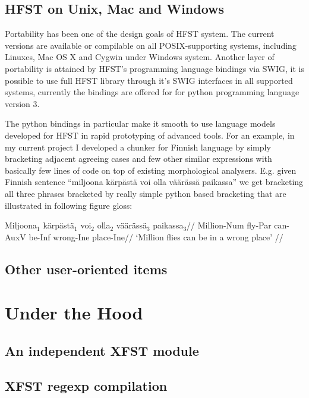 \documentclass{llncs}
\begin{document}
\subsection{HFST on Unix, Mac and Windows}

Portability has been one of the design goals of HFST system. The current 
versions are available or compilable on all POSIX-supporting systems, including
Linuxes, Mac OS X and Cygwin under Windows system. Another layer of portability
is attained by HFST's programming language bindings via SWIG, it is possible to
use full HFST library through it's SWIG interfaces in all supported systems,
currently the bindings are offered for for python programming language version
3.

The python bindings in particular make it smooth to use language models
developed for HFST in rapid prototyping of advanced tools. For an example, in
my current project I developed a chunker for Finnish language by simply
bracketing adjacent agreeing cases and few other similar expressions with
basically few lines of code on top of existing morphological analysers. E.g.
given Finnish sentence ``miljoona kärpästä voi olla väärässä paikassa'' we get
bracketing all three phrases bracketed by really simple python based bracketing
that are illustrated in following figure gloss:

\ex
\begingl
\gla Miljoona$_1$ kärpästä$_1$ voi$_2$ olla$_2$ väärässä$_3$ paikassa$_3$//
\glb Million-{\sc Num} fly-{\sc Par} can-{\sc AuxV} be-{\sc Inf} wrong-{\sc Ine} place-{\sc Ine}//
\glft `Million flies can be in a wrong place' //
\endgl
\xe



\subsection{Other user-oriented items}

\section{Under the Hood}

\subsection{An independent XFST module}

\subsection{XFST regexp compilation}
\end{document}
